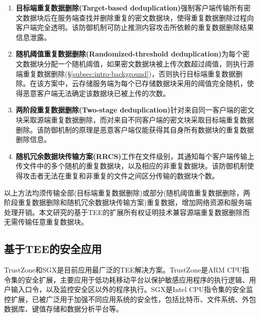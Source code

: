 \begin{enumerate}[leftmargin=0em]
    \item \textbf{目标端重复数据删除(Target-based deduplication)}\cite{harnik2010side}强制客户端传输所有密文数据块后在服务端查找并删除重复的密文数据块，使得重复数据删除过程向客户端完全透明。该防御机制可防止推测内容攻击所依赖的重复数据删除结果信息泄露。
    \item \textbf{随机阈值重复数据删除(Randomized-threshold deduplication)}\cite{harnik2010side}为每个密文数据块分配一个随机阈值，如果密文数据块被上传次数超过阈值，则执行源端重复数据删除(\S\ref{subsec:intro-background})，否则执行目标端重复数据删除。在该方案中，云存储服务端为每个已存储数据块采用的阈值完全随机，使得恶意客户端无法确定该数据块已被上传的次数。
    \item \textbf{两阶段重复数据删除(Two-stage deduplication)}\cite{li2015cdstore}针对来自同一客户端的密文块采取源端重复数据删除，而对来自不同客户端的密文块采取目标端重复数据删除。该防御机制的原理是恶意客户端仅能获得其自身所有数据块的重复数据删除信息。
    \item \textbf{随机冗余数据块传输方案(RRCS)}\cite{zuo2018mitigating}工作在文件级别，其通知每个客户端传输上传文件中的多个随机的重复数据块，以及相应的非重复数据块。该防御机制使得攻击者无法在重复和非重复的文件之间区分传输的数据块个数。
\end{enumerate}

以上方法均须传输全部(目标端重复数据删除)或部分(随机阈值重复数据删除，两阶段重复数据删除和随机冗余数据块传输方案)重复数据，增加网络资源和服务端处理开销。本文研究的基于TEE的扩展所有权证明技术兼容源端重复数据删除而无需传输任意重复数据块。

\subsection{基于TEE的安全应用}
\label{subsec:compare-tee}

TrustZone和SGX是目前应用最广泛的TEE解决方案\cite{pinto19}。TrustZone是ARM CPU指令集的安全扩展，主要应用于低功耗移动平台以保护敏感应用程序的执行逻辑\cite{rubinov2016automated}、用户输入口令\cite{ying2018truz}，以及监控安全区以外的程序执行\cite{azab2014hypervision}。SGX是Intel CPU指令集的安全监控扩展，已被广泛用于加强不同应用系统的安全性，包括比特币\cite{matetic19BITE}、文件系统\cite{ahmad2018OBLIVIATE,shinde20}、外包数据库\cite{eskandarian19,priebe18,sun21}、键值存储\cite{mishra2018Oblix,bailleu2019SPEICHER,kim2019ShieldStore,bailleu2021Avocado}和数据分析平台\cite{schuster15, zheng2017Opaque, bowe2020ZEXE}等。

